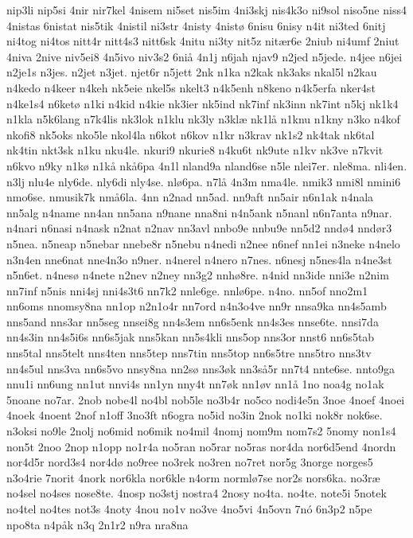 nip3li
nip5si
4nir
nir7kel
4nisem
ni5set
nis5im
4ni3skj
nis4k3o
ni9sol
niso5ne
niss4
4nistas
6nistat
nis5tik
4nistil
ni3str
4nisty
4nist^^f8
6nisu
6nisy
n4it
ni3ted
6nitj
ni4tog
ni4tos
nitt4r
nitt4s3
nitt6sk
4nitu
ni3ty
nit5z
nit^^e6r6e
2niub
ni4umf
2niut
4niva
2nive
niv5ei8
4n5ivo
niv3s2
6ni^^e5
4n1j
n6jah
njav9
n2jed
n5jede.
n4jee
n6jei
n2je1s
n3jes.
n2jet
n3jet.
njet6r
n5jett
2nk
n1ka
n2kak
nk3aks
nkal5l
n2kau
n4kedo
n4keer
n4keh
nk5eie
nkel5s
nkelt3
n4k5enh
n8keno
n4k5erfa
nker4st
n4ke1s4
n6ket^^f8
n1ki
n4kid
n4kie
nk3ier
nk5ind
nk7inf
nk3inn
nk7int
n5kj
nk1k4
n1kla
n5k6lang
n7k4lis
nk3lok
n1klu
nk3ly
n3kl^^e6
nk1l^^e5
n1knu
n1kny
n3ko
n4kof
nkofi8
nk5oks
nko5le
nkol4la
n6kot
n6kov
n1kr
n3krav
nk1s2
nk4tak
nk6tal
nk4tin
nkt3sk
n1ku
nku4le.
nkuri9
nkurie8
n4ku6t
nk9ute
n1kv
nk3ve
n7kvit
n6kvo
n9ky
n1k^^f8
n1k^^e5
nk^^e56pa
4n1l
nland9a
nland6se
n5le
nlei7er.
nle8ma.
nli4en.
n3lj
nlu4e
nly6de.
nly6di
nly4se.
nl^^f86pa.
n7l^^e5
4n3m
nma4le.
nmik3
nmi8l
nmini6
nmo6se.
nmusik7k
nm^^e56la.
4nn
n2nad
nn5ad.
nn9aft
nn5air
n6n1ak
n4nala
nn5alg
n4name
nn4an
nn5ana
n9nane
nna8ni
n4n5ank
n5nanl
n6n7anta
n9nar.
n4nari
n6nasi
n4nask
n2nat
n2nav
nn3avl
nnbo9e
nnbu9e
nn5d2
nnd^^f84
nnd^^f8r3
n5nea.
n5neap
n5nebar
nnebe8r
n5nebu
n4nedi
n2nee
n6nef
nn1ei
n3neke
n4nelo
n3n4en
nne6nat
nne4n3o
n9ner.
n4nerel
n4nero
n7nes.
n6nesj
n5nes4la
n4ne3st
n5n6et.
n4nes^^f8
n4nete
n2nev
n2ney
nn3g2
nnh^^f88re.
n4nid
nn3ide
nni3e
n2nim
nn7inf
n5nis
nni4sj
nni4s3t6
nn7k2
nnle6ge.
nnl^^f86pe.
n4no.
nn5of
nno2m1
nn6oms
nnomsy8na
nn1op
n2n1o4r
nn7ord
n4n3o4ve
nn9r
nnsa9ka
nn4s5amb
nns5and
nns3ar
nn5seg
nnsei8g
nn4s3em
nn6s5enk
nn4s3es
nnse6te.
nnsi7da
nn4s3in
nn4s5i6s
nn6s5jak
nns5kan
nn5s4kli
nns5op
nns3or
nnst6
nn6s5tab
nns5tal
nns5telt
nns4ten
nns5tep
nns7tin
nns5top
nn6s5tre
nns5tro
nns3tv
nn4s5ul
nns3va
nn6s5vo
nnsy8na
nn2s^^f8
nns3^^f8k
nn3s^^e55r
nn7t4
nnte6se.
nnto9ga
nnu1i
nn6ung
nn1ut
nnvi4s
nn1yn
nny4t
nn7^^f8k
nn1^^f8v
nn1^^e5
1no
noa4g
no1ak
5noane
no7ar.
2nob
nobe4l
no4bl
nob5le
no3b4r
no5co
nodi4e5n
3noe
4noef
4noei
4noek
4noent
2nof
n1off
3no3ft
n6ogra
no5id
no3in
2nok
no1ki
nok8r
nok6se.
n3oksi
no9le
2nolj
no6mid
no6mik
no4mil
4nomj
nom9m
nom7s2
5nomy
non1s4
non5t
2noo
2nop
n1opp
no1r4a
no5ran
no5rar
no5ras
nor4da
nor6d5end
4nordn
nor4d5r
nord3s4
nor4d^^f8
no9ree
no3rek
no3ren
no7ret
nor5g
3norge
norges5
n3o4rie
7norit
4nork
nor6kla
nor6kle
n4orm
norml^^f87se
nor2s
nors6ka.
no3r^^e6
no4sel
no4ses
nose8te.
4nosp
no3stj
nostra4
2nosy
no4ta.
no4te.
note5i
5notek
no4tel
no4tes
not3s
4noty
4nou
no1v
no3ve
4no5vi
4n5ovn
7n^^f3
6n3p2
n5pe
npo8ta
n4p^^e5k
n3q
2n1r2
n9ra
nra8na
